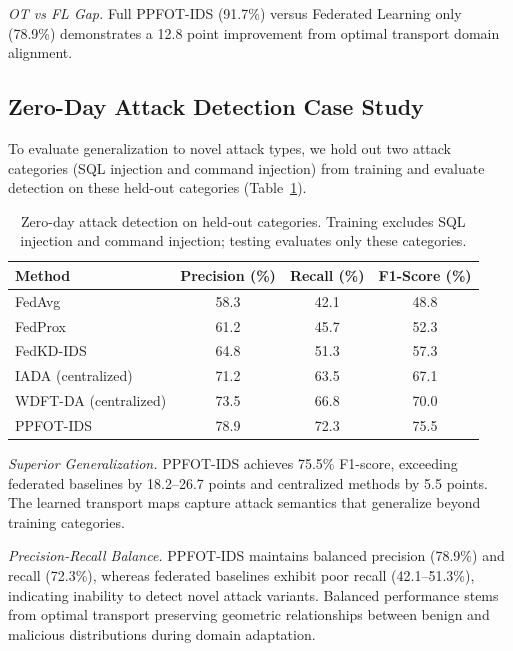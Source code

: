 \documentclass{ieeeaccess}
\theoremstyle{plain}
\theoremstyle{definition}
\theoremstyle{remark}
\begin{document}
\textit{OT vs FL Gap.} Full PPFOT-IDS (91.7\%) versus Federated Learning only (78.9\%) demonstrates a 12.8 point improvement from optimal transport domain alignment.

\subsection{Zero-Day Attack Detection Case Study}

To evaluate generalization to novel attack types, we hold out two attack categories (SQL injection and command injection) from training and evaluate detection on these held-out categories (Table~\ref{tab:zeroday}).

\begin{table}[!t]
\small
\setlength{\tabcolsep}{3.5pt}
\renewcommand{\arraystretch}{1.15}
\caption{Zero-day attack detection on held-out categories. Training excludes SQL injection and command injection; testing evaluates only these categories.}
\label{tab:zeroday}
\centering
\begin{tabular}{lccc}
\hline
\textbf{Method} & \textbf{Precision (\%)} & \textbf{Recall (\%)} & \textbf{F1-Score (\%)} \\
\hline
FedAvg & 58.3 & 42.1 & 48.8 \\
FedProx & 61.2 & 45.7 & 52.3 \\
FedKD-IDS & 64.8 & 51.3 & 57.3 \\
IADA (centralized) & 71.2 & 63.5 & 67.1 \\
WDFT-DA (centralized) & 73.5 & 66.8 & 70.0 \\
PPFOT-IDS & 78.9 & 72.3 & 75.5 \\
\hline
\end{tabular}
\end{table}

\textit{Superior Generalization.} PPFOT-IDS achieves 75.5\% F1-score, exceeding federated baselines by 18.2--26.7 points and centralized methods by 5.5 points. The learned transport maps capture attack semantics that generalize beyond training categories.

\textit{Precision-Recall Balance.} PPFOT-IDS maintains balanced precision (78.9\%) and recall (72.3\%), whereas federated baselines exhibit poor recall (42.1--51.3\%), indicating inability to detect novel attack variants. Balanced performance stems from optimal transport preserving geometric relationships between benign and malicious distributions during domain adaptation.


\end{document}

